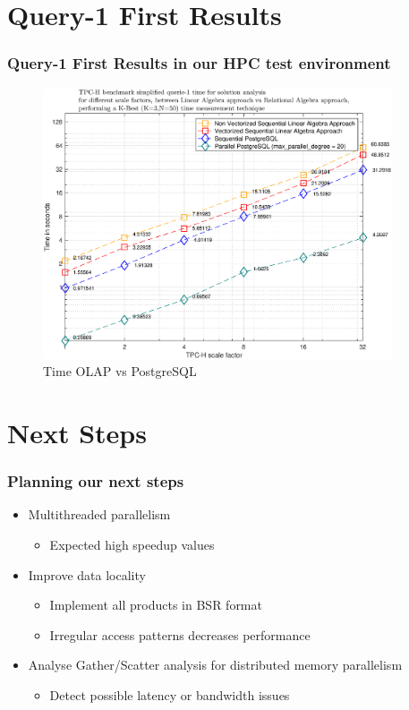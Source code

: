 \documentclass{beamer}
\begin{document}
\section{Query-1 First Results}
\begin{frame}[fragile]
\frametitle{Query-1 First Results in our HPC test environment}

\begin{figure}
    \centering
    \includegraphics[width=0.92\textwidth,keepaspectratio]{TIME_LA_vs_RA.eps}
    \caption{Time OLAP vs PostgreSQL}
    \label{fig:olap_vs_postgresql}
\end{figure}

\end{frame}
\section{Next Steps}
\begin{frame}[fragile]
\frametitle{Planning our next steps}

\begin{itemize}
    \item Multithreaded parallelism
    \begin{itemize}
        \item Expected high speedup values
    \end{itemize}
    \vspace{0.5cm}
    \item Improve data locality
    \begin{itemize}
    \item Implement all products in BSR format
            \item  Irregular access patterns decreases performance
    \end{itemize}
        \vspace{0.5cm}
    \item Analyse Gather/Scatter analysis for distributed memory parallelism
    \begin{itemize}
        \item Detect possible latency or bandwidth issues 
    \end{itemize}
\end{itemize}
\end{frame}

\begin{frame}
  \titlepage
\end{frame}
\end{document}

